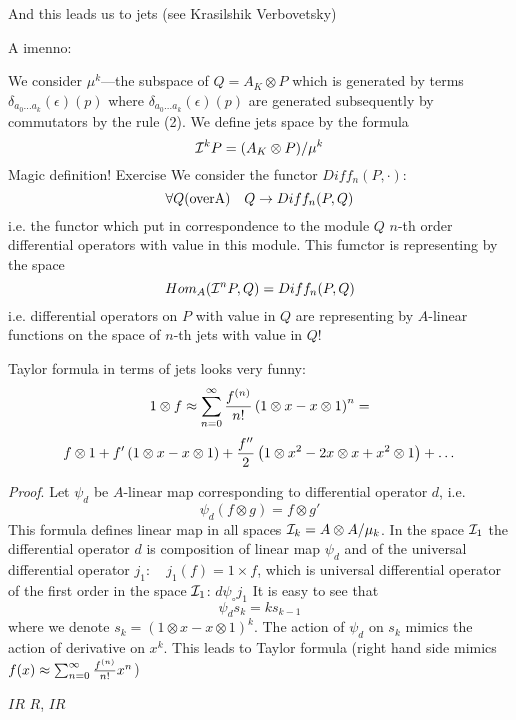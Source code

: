 And this leads us to jets (see Krasilshik Verbovetsky)

 A imenno:

 We consider $\mu^k$---the subspace of $Q=A_K\otimes P$
which is generated by terms
 $\delta_{a_0\dots a_k}(\epsilon)(p)$
where $\delta_{a_0\dots a_k}(\epsilon)(p)$
are generated subsequently by commutators by the rule (2).
We define jets space by the formula
               $$
            {\cal I}^k P=(A_K\otimes P)/\mu^k
                    $$
 Magic definition!
     Exercise
We consider the functor $Diff_n(P,\cdot)$:
                    $$
         \forall Q ({\rm over A})\quad
             Q\rightarrow Diff_n(P,Q)
                   $$
i.e. the functor which put in correspondence to the module
 $Q$ $n$-th order differential operators with value in this module.
This fumctor is representing by the space
                   $$
                  Hom_A({\cal I}^n P,Q)=Diff_n(P,Q)
               $$
i.e. differential operators on $P$ with value in $Q$ are representing
by $A$-linear functions on the   space of $n$-th jets
 with value in $Q$!


$$ $$
 Taylor formula in terms of jets looks very funny:
                    $$
     1\otimes f\approx\sum_{n=0}^\infty{f^{(n)}\over n!}
             \left(
             1\otimes x-x\otimes 1
             \right)^n=
                $$
                $$
     f\otimes 1+f'\left(1\otimes x-x\otimes 1\right)+
         {f''\over 2}
           \left(
             1\otimes x^2-2x\otimes x+x^2\otimes 1
             \right)+\dots
                    $$

  {\it Proof}.  Let $\psi_d$ be $A$-linear map corresponding to
  differential operator $d$, i.e.
       $$
    \psi_d(f\otimes g)=f\otimes g'
       $$
This formula defines linear map in all spaces ${\cal I}_k=A\otimes
A/\mu_k$. In the space ${\cal I}_1$ the differential operator $d$ is
composition of linear map $\psi_d$ and of the universal differential
operator $j_1\colon\quad j_1(f)=1\times f$, which is universal
differential operator of the first order in the space ${\cal I}_1$:
             $d\psi_\circ j_1$
   It is easy to see that
                 $$
             \psi_d s_k=ks_{k-1}
                    $$
   where we denote  $s_k=\left(1\otimes x-x\otimes 1\right)^k$.
The action of $\psi_d$ on $s_k$ mimics the action of derivative on
$x^k$.  This leads to Taylor formula  (right hand side mimics
$f(x)\approx \sum_{n=0}^\infty{f^{(n)}\over n!}x^n$)


$I\!\!\! R$  $R$, $I\!\! R$

  \bye
